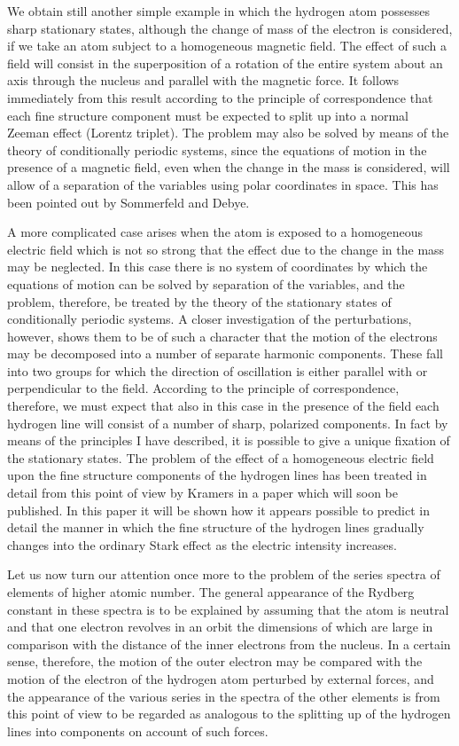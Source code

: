 We obtain still another simple example in which the hydrogen
atom possesses sharp stationary states, although the change of mass
of the electron is considered, if we take an atom subject to a homogeneous
magnetic field. The effect of such a field will consist in
the superposition of a rotation of the entire system about an axis
through the nucleus and parallel with the magnetic force. It follows
immediately from this result according to the principle of correspondence
that each fine structure component must be expected
to split up into a normal Zeeman effect (Lorentz triplet). The
problem may also be solved by means of the theory of conditionally
periodic systems, since the equations of motion in the presence
of a magnetic field, even when the change in the mass is considered,
will allow of a separation of the variables using polar
coordinates in space. This has been pointed out by Sommerfeld
and Debye.

A more complicated case arises when the atom is exposed to a
homogeneous electric field which is not so strong that the effect
due to the change in the mass may be neglected. In this case there
is no system of coordinates by which the equations of motion can
be solved by separation of the variables, and the problem, therefore,
 be treated by the theory of the stationary states of conditionally
periodic systems. A closer investigation of the perturbations,
however, shows them to be of such a character that the motion
of the electrons may be decomposed into a number of separate harmonic
components. These fall into two groups for which the direction
of oscillation is either parallel with or perpendicular to the
field. According to the principle of correspondence, therefore, we
must expect that also in this case in the presence of the field each
hydrogen line will consist of a number of sharp, polarized components.
In fact by means of the principles I have described, it is
possible to give a unique fixation of the stationary states. The
problem of the effect of a homogeneous electric field upon the fine
structure components of the hydrogen lines has been treated in
detail from this point of view by Kramers in a paper which will
soon be published. In this paper it will be shown how it appears
possible to predict in detail the manner in which the fine structure
of the hydrogen lines gradually changes into the ordinary Stark
effect as the electric intensity increases.

 Let us now turn our attention once
more to the problem of the series spectra of elements of higher
atomic number. The general appearance of the Rydberg constant
in these spectra is to be explained by assuming that the atom is
neutral and that one electron revolves in an orbit the dimensions
of which are large in comparison with the distance of the inner electrons
from the nucleus. In a certain sense, therefore, the motion of
the outer electron may be compared with the motion of the electron
of the hydrogen atom perturbed by external forces, and the appearance
of the various series in the spectra of the other elements is
from this point of view to be regarded as analogous to the splitting
up of the hydrogen lines into components on account of such forces.

